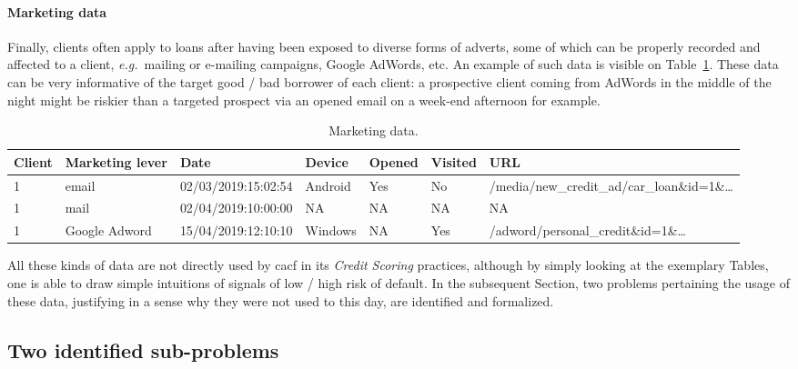 \paragraph{Marketing data}

Finally, clients often apply to loans after having been exposed to diverse forms of adverts, some of which can be properly recorded and affected to a client, \textit{e.g.}\ mailing or e-mailing campaigns, Google AdWords, etc. An example of such data is visible on Table~\ref{tab:marketing_data}. These data can be very informative of the target good / bad borrower of each client: a prospective client coming from AdWords in the middle of the night might be riskier than a targeted prospect via an opened email on a week-end afternoon for example.

\begin{table}[ht]
    \centering
    \caption{Marketing data.}
    \label{tab:marketing_data}
    \begin{tiny}
\begin{tabular}{lllllll}
Client & Marketing lever & Date & Device & Opened & Visited & URL \\
 \hline
1 & email & 02/03/2019:15:02:54 & Android & Yes & No & /media/new\_credit\_ad/car\_loan\&id=1\&\dots \\
1 & mail & 02/04/2019:10:00:00 & NA & NA & NA & NA \\
1 & Google Adword & 15/04/2019:12:10:10 & Windows & NA & Yes & /adword/personal\_credit\&id=1\&\dots \\
\end{tabular}
    \end{tiny}
\end{table}

All these kinds of data are not directly used by \gls{cacf} in its \textit{Credit Scoring} practices, although by simply looking at the exemplary Tables, one is able to draw simple intuitions of signals of low / high risk of default. In the subsequent Section, two problems pertaining the usage of these data, justifying in a sense why they were not used to this day, are identified and formalized.


\subsection{Two identified sub-problems}

